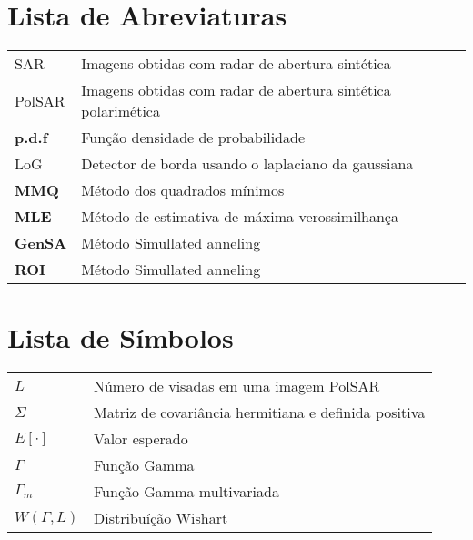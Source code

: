 \documentclass[11pt,twoside,a4paper]{book}
\begin{document}
%

\tableofcontents    %

\chapter{Lista de Abreviaturas}
\begin{tabular}{ll}
SAR            & Imagens obtidas com radar de abertura sintética\\
PolSAR         & Imagens obtidas com radar de abertura sintética polarimética\\
\textbf{p.d.f} & Função densidade de probabilidade\\
LoG            & Detector de borda usando o laplaciano da gaussiana\\
\textbf{MMQ}   & Método dos quadrados mínimos\\
\textbf{MLE}   & Método de estimativa de máxima verossimilhança\\
\textbf{GenSA} & Método Simullated anneling\\
\textbf{ROI} & Método Simullated anneling\\
\end{tabular}

\chapter{Lista de Símbolos}
\begin{tabular}{ll}
        $L$         & Número de visadas em uma imagem PolSAR\\
        $\Sigma$    & Matriz de covariância hermitiana e definida positiva \\
	$E[\cdot]$  & Valor esperado\\
	$\Gamma$    & Função Gamma \\
	$\Gamma_m$  & Função Gamma multivariada\\
	$W(\Gamma, L)$ & Distribuíção Wishart\\
\end{tabular}
\end{document}
